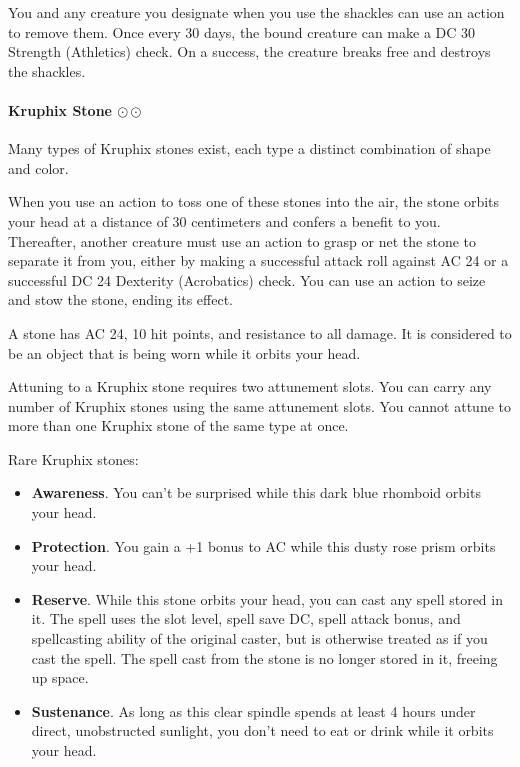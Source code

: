         You and any creature you designate when you use the shackles can use an action to remove them.
        Once every 30 days, the bound creature can make a DC 30 Strength (Athletics) check.
        On a success, the creature breaks free and destroys the shackles.
    \paragraph{Kruphix Stone $\odot\odot$}
        Many types of Kruphix stones exist, each type a distinct combination of shape and color.

        When you use an action to toss one of these stones into the air, the stone orbits your head at a distance of 30 centimeters and confers a benefit to you.
        Thereafter, another creature must use an action to grasp or net the stone to separate it from you, either by making a successful attack roll against AC 24 or a successful DC 24 Dexterity (Acrobatics) check.
        You can use an action to seize and stow the stone, ending its effect.

        A stone has AC 24, 10 hit points, and resistance to all damage.
        It is considered to be an object that is being worn while it orbits your head.

        Attuning to a Kruphix stone requires two attunement slots.
        You can carry any number of Kruphix stones using the same attunement slots.
        You cannot attune to more than one Kruphix stone of the same type at once.

        Rare Kruphix stones:
        \begin{itemize}
            \item \textbf{Awareness}.
            You can't be surprised while this dark blue rhomboid orbits your head.
            \item \textbf{Protection}.
            You gain a +1 bonus to AC while this dusty rose prism orbits your head.
            \item \textbf{Reserve}.
            While this stone orbits your head, you can cast any spell stored in it.
            The spell uses the slot level, spell save DC, spell attack bonus, and spellcasting ability of the original caster, but is otherwise treated as if you cast the spell.
            The spell cast from the stone is no longer stored in it, freeing up space.
            \item \textbf{Sustenance}.
            As long as this clear spindle spends at least 4 hours under direct, unobstructed sunlight, you don't need to eat or drink while it orbits your head.
        \end{itemize}

